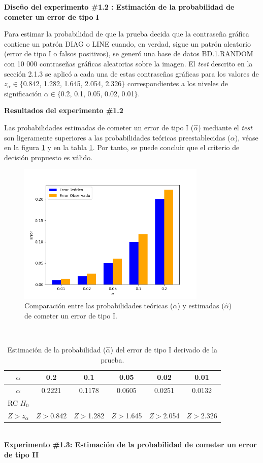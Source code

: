 \documentclass[12pt]{report}
\begin{document}
	\textbf{Diseño del experimento \#1.2 : Estimación de la probabilidad de cometer un error de tipo I} 
	
	Para estimar la probabilidad de que la prueba decida que la contraseña gráfica contiene un patrón DIAG o LINE cuando, en verdad, sigue un patrón aleatorio (error de tipo I o falsos positivos), se generó una base de datos BD.1.RANDOM con 10 000 contraseñas gráficas aleatorias sobre la imagen. El \textit{test} descrito en la sección 2.1.3 se aplicó a cada una de estas contraseñas gráficas para los valores de $z_\alpha \in \{$0.842, 1.282, 1.645, 2.054, 2.326$\}$ correspondientes a los niveles de significación $\alpha \in \{$0.2, 0.1, 0.05, 0.02, 0.01$\}$.
	


\textbf{Resultados del experimento \#1.2}

Las probabilidades estimadas de cometer un error de tipo I ($\hat{\alpha}$) mediante el \textit{test} son ligeramente superiores  a las probabilidades teóricas preestablecidas ($\alpha$), véase en la figura \ref{Teorico vs Observado} y en la tabla \ref{3td:error1-prob}. Por tanto, se puede concluir que el criterio de decisión propuesto es válido.
	\begin{figure}[ht]
	\centering
	
	\includegraphics[width=0.8\textwidth]{3td_teo_obs.png}
	\caption{Comparación entre las probabilidades teóricas ($\alpha$) y estimadas ($\hat{\alpha}$) de cometer un error de tipo I. }
	\label{Teorico vs Observado}
\end{figure}\\
\begin{table}[h!]
	\centering
	\begin{tabular}{|c|ccccc|}
		\hline
		$\alpha$ &  0.2 &  0.1 &  0.05 & 0.02 &  0.01 \\
		\hline
		$\hat{\alpha}$ & 0.2221 & 0.1178 & 0.0605 & 0.0251 & 0.0132 \\
		\hline
		RC $H_0$      &         &         &        &        &  \\
		 $Z>z_\alpha$&  $Z>$0.842& $Z>$1.282& $Z>$1.645& $Z>$2.054& $Z>$2.326 \\
		\hline
	\end{tabular}
	\caption{Estimación de la probabilidad ($\hat{\alpha}$) del error de tipo I derivado de la prueba.}
	\label{3td:error1-prob}
\end{table}
\\
\textbf{Experimento \#1.3: Estimación de la probabilidad de cometer un error de tipo II}
\end{document}
